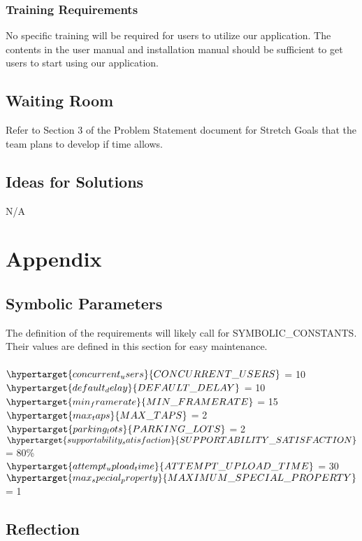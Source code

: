 \documentclass[12pt,letterpaper]{article}
\begin{document}
\subsubsection{Training Requirements}
No specific training will be required for users to utilize our application. The contents in the user manual and installation manual should be sufficient to get users to start using our application.
\subsection{Waiting Room}
Refer to Section 3 of the Problem Statement document for Stretch Goals that the team plans to develop if time allows.
\subsection{Ideas for Solutions}
N/A

\newpage
\section{Appendix}
\label{appendix}
\subsection{Symbolic Parameters}
The definition of the requirements will likely call for SYMBOLIC\_CONSTANTS. Their values are defined in this section for easy maintenance.\\ \\
$\hypertarget{concurrent_users}{CONCURRENT\_USERS}$ = 10 \\
$\hypertarget{default_delay}{DEFAULT\_DELAY}$ = 10 \\
$\hypertarget{min_framerate}{MIN\_FRAMERATE}$ = 15 \\
$\hypertarget{max_taps}{MAX\_TAPS}$ = 2 \\
$\hypertarget{parking_lots}{PARKING\_LOTS}$ = 2 \\
$\hypertarget{supportability_satisfaction}{SUPPORTABILITY\_SATISFACTION}$ = 80\% \\
$\hypertarget{attempt_upload_time}{ATTEMPT\_UPLOAD\_TIME}$ = 30 \\
$\hypertarget{max_special_property}{MAXIMUM\_SPECIAL\_PROPERTY}$ = 1 \\

\subsection{Reflection}
\label{reflection}
\end{document}
